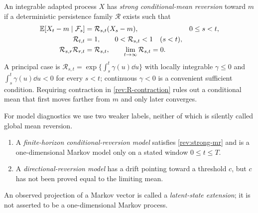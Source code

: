 \begin{definition}
\label{rev:def-strong-mr}
An integrable adapted process $X$ has \emph{strong conditional-mean reversion}
toward $m$ if a deterministic persistence family $\mathcal R$ exists such that
\begin{align}
\mathbb E[X_t-m\mid\mathcal F_s]&=\mathcal R_{s,t}(X_s-m),
      &&0\le s<t,\label{rev:strong-mr}\\
\mathcal R_{t,t}&=1,\qquad 0<\mathcal R_{s,t}<1\quad(s<t),
\label{rev:R-contraction}\\
\mathcal R_{s,r}\mathcal R_{r,t}&=\mathcal R_{s,t},\qquad
\lim_{t\to\infty}\mathcal R_{s,t}=0.\label{rev:R-properties}
\end{align}
A principal case is
$\mathcal R_{s,t}=\exp\{\int_s^t\gamma(u)\dd u\}$ with locally integrable
$\gamma\leq0$ and $\int_s^t\gamma(u)\dd u<0$ for every $s<t$; continuous
$\gamma<0$ is a convenient sufficient condition.  Requiring contraction in
\eqref{rev:R-contraction} rules out a conditional mean that first moves farther
from $m$ and only later converges.
\end{definition}

\begin{definition}
\label{rev:def-auxiliary-classes}
For model diagnostics we use two weaker labels, neither of which is silently
called global mean reversion.
\begin{enumerate}[label=(\roman*)]
\item A \emph{finite-horizon conditional-reversion model} satisfies
\eqref{rev:strong-mr} and is a one-dimensional Markov model only on a stated
window $0\le t\le T$.
\item A \emph{directional-reversion model} has a drift pointing toward a
threshold $c$, but $c$ has not been proved equal to the limiting mean.
\end{enumerate}
An observed projection of a Markov vector is called a \emph{latent-state
extension}; it is not asserted to be a one-dimensional Markov process.
\end{definition}

